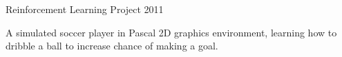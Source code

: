\begin{cvprojects}
  \cvproject
    {Reinforcement Learning Project} %
    {} %
    {} %
    {2011} %
    {
      \begin{cvitems} %
        \item {A simulated soccer player in Pascal 2D graphics environment, learning how to dribble a ball to increase chance of making a goal.}
      \end{cvitems}
    }

\end{cvprojects}